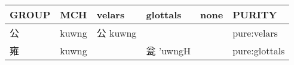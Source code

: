 \documentclass[14pt,a4paper]{scrartcl}
\begin{document}
\begin{longtable}[c]{@{}llllll@{}}
\toprule
\begin{minipage}[b]{0.14\columnwidth}\raggedright\strut
GROUP
\strut\end{minipage} &
\begin{minipage}[b]{0.14\columnwidth}\raggedright\strut
MCH
\strut\end{minipage} &
\begin{minipage}[b]{0.14\columnwidth}\raggedright\strut
velars
\strut\end{minipage} &
\begin{minipage}[b]{0.14\columnwidth}\raggedright\strut
glottals
\strut\end{minipage} &
\begin{minipage}[b]{0.14\columnwidth}\raggedright\strut
none
\strut\end{minipage} &
\begin{minipage}[b]{0.14\columnwidth}\raggedright\strut
PURITY
\strut\end{minipage}\tabularnewline
\midrule
\endhead
\begin{minipage}[t]{0.14\columnwidth}\raggedright\strut
公
\strut\end{minipage} &
\begin{minipage}[t]{0.14\columnwidth}\raggedright\strut
kuwng
\strut\end{minipage} &
\begin{minipage}[t]{0.14\columnwidth}\raggedright\strut
公 kuwng
\strut\end{minipage} &
\begin{minipage}[t]{0.14\columnwidth}\raggedright\strut
\strut\end{minipage} &
\begin{minipage}[t]{0.14\columnwidth}\raggedright\strut
\strut\end{minipage} &
\begin{minipage}[t]{0.14\columnwidth}\raggedright\strut
pure:velars
\strut\end{minipage}\tabularnewline
\begin{minipage}[t]{0.14\columnwidth}\raggedright\strut
雍
\strut\end{minipage} &
\begin{minipage}[t]{0.14\columnwidth}\raggedright\strut
kuwng
\strut\end{minipage} &
\begin{minipage}[t]{0.14\columnwidth}\raggedright\strut
\strut\end{minipage} &
\begin{minipage}[t]{0.14\columnwidth}\raggedright\strut
瓮 'uwngH
\strut\end{minipage} &
\begin{minipage}[t]{0.14\columnwidth}\raggedright\strut
\strut\end{minipage} &
\begin{minipage}[t]{0.14\columnwidth}\raggedright\strut
pure:glottals
\strut\end{minipage}\tabularnewline
\bottomrule
\end{longtable}
\end{document}
